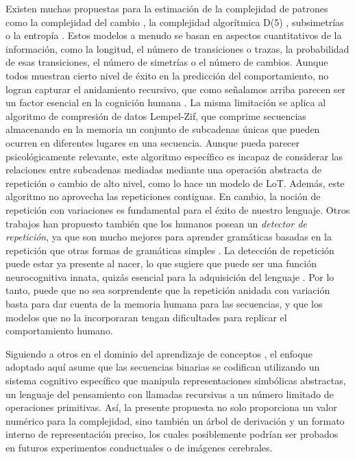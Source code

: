 Existen muchas propuestas para la estimación de la complejidad de patrones como la complejidad del cambio \cite{f47}, la complejidad algorítmica D(5) \cite{f44,f45,f46}, subsimetrías \cite{f94} o la entropía \cite{f34,f96,f97,f98,f111}. Estos modelos a menudo se basan en aspectos cuantitativos de la información, como la longitud, el número de transiciones o trazas, la probabilidad de esas transiciones, el número de simetrías o el número de cambios. Aunque todos muestran cierto nivel de éxito en la predicción del comportamiento, no logran capturar el anidamiento recursivo, que como señalamos arriba parecen ser un factor esencial en la cognición humana \cite{f4,f6}. La misma limitación se aplica al algoritmo de compresión de datos Lempel-Zif, que comprime secuencias almacenando en la memoria un conjunto de subcadenas únicas que pueden ocurren en diferentes lugares en una secuencia. Aunque pueda parecer psicológicamente relevante, este algoritmo específico es incapaz de considerar las relaciones entre subcadenas mediadas mediante una operación abstracta de repetición o cambio de alto nivel, como lo hace un modelo de LoT. Además, este algoritmo no aprovecha las repeticiones contiguas. En cambio, la noción de repetición con variaciones es fundamental para el éxito de nuestro lenguaje. Otros trabajos han propuesto también que los humanos posean un \textit{detector de repetición}, ya que son mucho mejores para aprender gramáticas basadas en la repetición que otras formas de gramáticas simples \cite{f113}. La detección de repetición puede estar ya presente al nacer, lo que sugiere que puede ser una función neurocognitiva innata, quizás esencial para la adquisición del lenguaje \cite{f114}. Por lo tanto, puede que no sea sorprendente que la repetición anidada con variación basta para dar cuenta de la memoria humana para las secuencias, y que los modelos que no la incorporaran tengan dificultades para replicar el comportamiento humano.


Siguiendo a otros en el dominio del aprendizaje de conceptos \cite{piantadosi2012bootstrapping,piantadosi2016logical}, el enfoque adoptado aquí asume que las secuencias binarias se codifican utilizando un sistema cognitivo específico que manipula representaciones simbólicas abstractas, un lenguaje del pensamiento con llamadas recursivas a un número limitado de operaciones primitivas. Así, la presente propuesta no solo proporciona un valor numérico para la complejidad, sino también un árbol de derivación y un formato interno de representación preciso, los cuales posiblemente podrían ser probados en futuros experimentos conductuales o de imágenes cerebrales.

